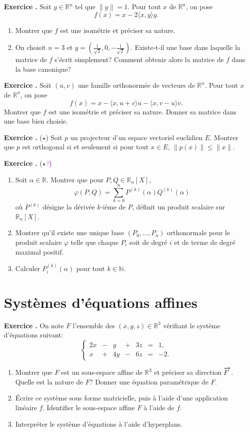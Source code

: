 \documentclass[10pt,a4paper]{article}
\def\bf#1{\textbf{#1}}
\newcounter{nexo}
\newcommand{\exo}{\medskip\noindent \bf{ Exercice \thenexo. \stepcounter{nexo}}}
\def\afaire#1{\textit{\textcolor{magenta}{#1}}}
\def\be{\begin{enumerate}}
\def\ee{\end{enumerate}}
\def\N{\mathbb{N}}
\def\R{\mathbb{R}}
\def\vect#1{\overrightarrow{\kern-1pt#1\kern 2pt}}
\begin{document}
\exo
Soit $y \in \R^n$ tel que $\|y\| = 1$. Pour tout $x$ de $\R^n$, on pose
\[f(x) = x - 2 \langle x,y \rangle y.\]
\be
\item Montrer que $f$ est une isométrie et préciser sa nature.
\item On choisit $n=3$ et $y = \left({\frac 1 {\sqrt 2}, 0, -\frac 1 {\sqrt 2}}\right)$. Existe-t-il une base dans laquelle la matrice de $f$ s'écrit simplement? Comment obtenir alors la matrice de $f$ dans la base canonique?
\ee

\exo %
Soit $(u,v)$ une famille orthonormée de vecteurs de $\R^n$. Pour tout $x$ de $\R^n$, on pose
\[f(x) = x - \langle x,u+v \rangle u - \langle x,v-u \rangle v.\] %
Montrer que $f$ est une isométrie et préciser sa nature. 
Donner sa matrice dans une base bien choisie.


\exo($\star$)
Soit $p$ un projecteur d'un espace vectoriel euclidien $E$. Montrer que $p$ est orthogonal si et seulement si pour tout $x \in E$, $\|p(x)\| \leq \|x\|$.

\exo($\star$\afaire{?})
\be
\item Soit $\alpha \in \R$. Montrer que pour $P, Q \in \R_n[X]$, 
$$\varphi(P,Q) = \sum_{k=0}^n P^{(k)}(\alpha) Q^{(k)} (\alpha)$$
où  $P^{(k)}$ désigne la dérivée $k$-ième de $P$, définit un produit scalaire sur $\R_n[X]$.
\item Montrer qu'il existe une unique base $(P_0, \ldots, P_n)$ orthonormale pour le produit scalaire $\varphi$ telle que chaque $P_i$ soit de degré $i$ et de terme de degré maximal positif.
\item Calculer $P_i^{(k)}(\alpha)$ pour tout $k \in \N$.
\ee



\section{Syst\`emes d'\'equations affines}

\exo 
On note $F$ l'ensemble des  $(x,y,z)\in\R^3$ v\'erifiant le syst\`eme d'\'equations suivant:
$$
\left\{\begin{array}{lrlrlrlrlcl} 
2x &-& y  &+ & 3 z &=& 1,\\
x  &+& 4y& -&6z   &=& -2 .
\end{array}\right.
$$
\begin{enumerate}
  \item Montrer que $F$ est un sous-espace affine de $\R^3$ et préciser sa direction $\vect{F}$. 
Quelle est la nature de $F$? Donner une équation paramétrique de $F$.
 \item \'Ecrire ce système sous forme matricielle, puis à l'aide d'une application linéaire $f$. Identifier 
 le sous-espace affine $F$ à l'aide de $f$.
 \item Interpréter le système d'équations à l'aide d'hyperplans.
\end{enumerate}
\end{document}
